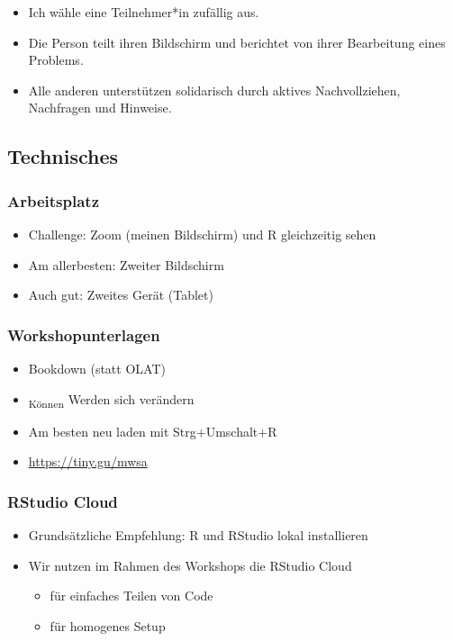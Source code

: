 \documentclass[
  ngerman,
]{article}
\providecommand{\tightlist}{%
  \setlength{\itemsep}{0pt}\setlength{\parskip}{0pt}}
\begin{document}
\begin{itemize}
\tightlist
\item
  Ich wähle eine Teilnehmer*in zufällig aus.
\item
  Die Person teilt ihren Bildschirm und berichtet von ihrer Bearbeitung eines Problems.
\item
  Alle anderen unterstützen solidarisch durch aktives Nachvollziehen, Nachfragen und Hinweise.
\end{itemize}

\hypertarget{technisches}{%
\subsection{Technisches}\label{technisches}}

\hypertarget{arbeitsplatz}{%
\subsubsection{Arbeitsplatz}\label{arbeitsplatz}}

\begin{itemize}
\tightlist
\item
  Challenge: Zoom (meinen Bildschirm) und R gleichzeitig sehen
\item
  Am allerbesten: Zweiter Bildschirm
\item
  Auch gut: Zweites Gerät (Tablet)
\end{itemize}

\hypertarget{workshopunterlagen}{%
\subsubsection{Workshopunterlagen}\label{workshopunterlagen}}

\begin{itemize}
\tightlist
\item
  Bookdown (statt OLAT)
\item
  \textsubscript{Können} Werden sich verändern
\item
  Am besten neu laden mit Strg+Umschalt+R
\item
  \url{https://tiny.gu/mwsa}
\end{itemize}

\hypertarget{rstudio-cloud}{%
\subsubsection{RStudio Cloud}\label{rstudio-cloud}}

\begin{itemize}
\tightlist
\item
  Grundsätzliche Empfehlung: R und RStudio lokal installieren
\item
  Wir nutzen im Rahmen des Workshops die RStudio Cloud

  \begin{itemize}
  \tightlist
  \item
    für einfaches Teilen von Code
  \item
    für homogenes Setup
  \end{itemize}
\end{itemize}
\end{document}
